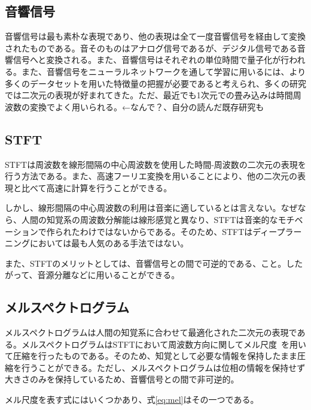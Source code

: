 \subsection{音響信号}

音響信号は最も素朴な表現であり、他の表現は全て一度音響信号を経由して変換されたものである。音そのものはアナログ信号であるが、デジタル信号である音響信号へと変換される。また、音響信号はそれぞれの単位時間で量子化が行われる。また、音響信号をニューラルネットワークを通して学習に用いるには、より多くのデータセットを用いた特徴量の把握が必要であると考えられ、多くの研究では二次元の表現が好まれてきた。ただ、最近でも1次元での畳み込みは時間周波数の変換でよく用いられる。←なんで？、自分の読んだ既存研究も


\subsection{STFT}

STFTは周波数を線形間隔の中心周波数を使用した時間-周波数の二次元の表現を行う方法である。また、高速フーリエ変換を用いることにより、他の二次元の表現と比べて高速に計算を行うことができる。

しかし、線形間隔の中心周波数の利用は音楽に適しているとは言えない。なぜなら、人間の知覚系の周波数分解能は線形感覚と異なり、STFTは音楽的なモチベーションで作られたわけではないからである。そのため、STFTはディープラーニングにおいては最も人気のある手法ではない。

また、STFTのメリットとしては、音響信号との間で可逆的である、こと。したがって、音源分離などに用いることができる。

\subsection{メルスペクトログラム}

メルスペクトログラムは人間の知覚系に合わせて最適化された二次元の表現である。メルスペクトログラムはSTFTにおいて周波数方向に関してメル尺度~\cite{melscale}を用いて圧縮を行ったものである。そのため、知覚として必要な情報を保持したまま圧縮を行うことができる。ただし、メルスペクトログラムは位相の情報を保持せず大きさのみを保持しているため、音響信号との間で非可逆的。

メル尺度を表す式にはいくつかあり、式\ref{eq:mel}はその一つである。

\begin{align}
    \label{eq:mel}
\end{align}

